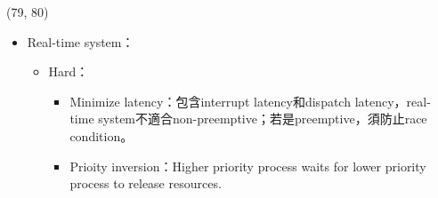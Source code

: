 \begin{theorem}{(79, 80)}
\begin{itemize}
\begin{itemize}
\begin{itemize}
            \end{itemize}
        \end{itemize}
        \item Real-time system：\begin{itemize}
            \item Hard：\begin{itemize}
                \item Minimize latency：包含interrupt latency和dispatch latency，real-time system不適合non-preemptive；若是preemptive，須防止race condition。
                \item Prioity inversion：Higher priority process waits for lower priority process to release resources. 
            \end{itemize}
        \end{itemize}
    \end{itemize}
\end{theorem}

